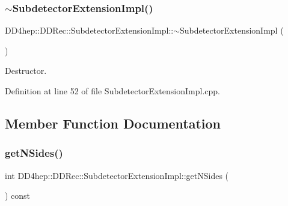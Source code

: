 \hypertarget{class_d_d4hep_1_1_d_d_rec_1_1_subdetector_extension_impl_afd3a7134db3e0d40b6fc9cdbb809f147}{}\label{class_d_d4hep_1_1_d_d_rec_1_1_subdetector_extension_impl_afd3a7134db3e0d40b6fc9cdbb809f147} 
\subsubsection{\texorpdfstring{$\sim$\+Subdetector\+Extension\+Impl()}{~SubdetectorExtensionImpl()}}
{\footnotesize\ttfamily D\+D4hep\+::\+D\+D\+Rec\+::\+Subdetector\+Extension\+Impl\+::$\sim$\+Subdetector\+Extension\+Impl (\begin{DoxyParamCaption}{ }\end{DoxyParamCaption})\hspace{0.3cm}{\ttfamily [virtual]}}



Destructor. 



Definition at line 52 of file Subdetector\+Extension\+Impl.\+cpp.



\subsection{Member Function Documentation}
\hypertarget{class_d_d4hep_1_1_d_d_rec_1_1_subdetector_extension_impl_a1f9b794b782aef4c2da0d1399d4e001b}{}\label{class_d_d4hep_1_1_d_d_rec_1_1_subdetector_extension_impl_a1f9b794b782aef4c2da0d1399d4e001b} 
\subsubsection{\texorpdfstring{get\+N\+Sides()}{getNSides()}}
{\footnotesize\ttfamily int D\+D4hep\+::\+D\+D\+Rec\+::\+Subdetector\+Extension\+Impl\+::get\+N\+Sides (\begin{DoxyParamCaption}{ }\end{DoxyParamCaption}) const\hspace{0.3cm}{\ttfamily [virtual]}}



